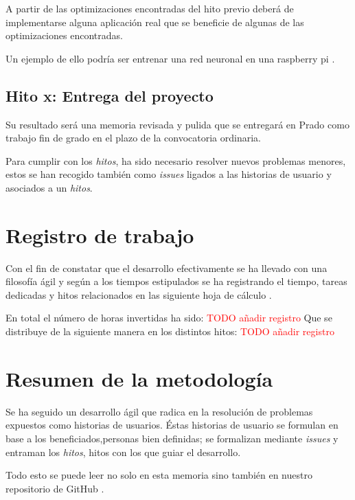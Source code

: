 A partir de las optimizaciones encontradas del hito previo deberá de implementarse alguna aplicación real que se beneficie de algunas de las optimizaciones encontradas. 

Un ejemplo de ello podría ser entrenar una red neuronal en una raspberry pi .



\subsection*{Hito x: Entrega del proyecto}

Su resultado será una memoria revisada y pulida que se entregará en Prado como trabajo fin de grado en el plazo de la convocatoria ordinaria. 

Para cumplir con los \textit{hitos},  ha sido necesario resolver nuevos  problemas menores, estos se han
recogido también como \textit{issues} ligados a las historias de usuario y asociados a un  \textit{hitos}.

\section{Registro de trabajo}  

Con el fin de constatar que el desarrollo efectivamente se ha 
llevado con una filosofía ágil y según a los tiempos estipulados se ha registrando el tiempo, tareas dedicadas  y hitos relacionados
en las siguiente hoja de cálculo \cite{TFG-hoja-calculo-horas-trabajo}.

En total el número de horas invertidas ha sido: 
\textcolor{red}{TODO añadir registro}
Que se distribuye de la siguiente manera en los distintos hitos: 
\textcolor{red}{TODO añadir registro}


\section{Resumen de la metodología}  

Se ha seguido un desarrollo ágil que radica en la resolución de problemas expuestos como historias de usuarios. 
Éstas historias de usuario se formulan en base a los beneficiados,personas bien definidas; se formalizan 
mediante \textit{issues} y entraman los \textit{hitos}, hitos con los que guiar el desarrollo.

Todo esto se puede leer no solo en esta memoria sino también en nuestro repositorio de GitHub \cite{TFG-Estudio-de-las-redes-neuronales}. 
 




